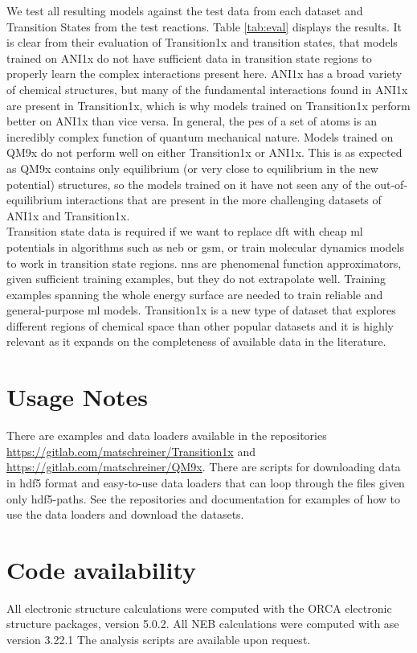 \documentclass[twoside,twocolumn]{article}
\begin{document}
We test all resulting models against the test data from each dataset and Transition States from the test reactions. Table \ref{tab:eval} displays the results. It is clear from their evaluation of Transition1x and transition states, that models trained on ANI1x do not have sufficient data in transition state regions to properly learn the complex interactions present here. ANI1x has a broad variety of chemical structures, but many of the fundamental interactions found in ANI1x are present in Transition1x, which is why models trained on Transition1x perform better on ANI1x than vice versa. In general, the \gls{pes} of a set of atoms is an incredibly complex function of quantum mechanical nature. Models trained on QM9x do not perform well on either Transition1x or ANI1x. This is as expected as QM9x contains only equilibrium (or very close to equilibrium in the new potential) structures, so the models trained on it have not seen any of the out-of-equilibrium interactions that are present in the more challenging datasets of ANI1x and Transition1x.
\\ 

Transition state data is required if we want to replace \gls{dft} with cheap \gls{ml} potentials in algorithms such as \gls{neb}\cite{neuralneb} or \gls{gsm}, or train molecular dynamics models to work in transition state regions. \glspl{nn} are phenomenal function approximators, given sufficient training examples, but they do not extrapolate well. Training examples spanning the whole energy surface are needed to train reliable and general-purpose \gls{ml} models. Transition1x is a new type of dataset that explores different regions of chemical space than other popular datasets and it is highly relevant as it expands on the completeness of available data in the literature. 

\section*{Usage Notes}
There are examples and data loaders available in the repositories  \href{https://gitlab.com/matschreiner/Transition1x}{https://gitlab.com/matschreiner/Transition1x} and \href{https://gitlab.com/matschreiner/QM9x}{https://gitlab.com/matschreiner/QM9x}. There are scripts for downloading data in \gls{hdf5} format and easy-to-use data loaders that can loop through the files given only hdf5-paths. See the repositories and documentation for examples of how to use the data loaders and download the datasets.

\section*{Code availability}
All electronic structure calculations were computed with the ORCA electronic structure packages, version 5.0.2. All NEB calculations were computed with \gls{ase} version 3.22.1 The analysis scripts are available upon request. 
\end{document}

